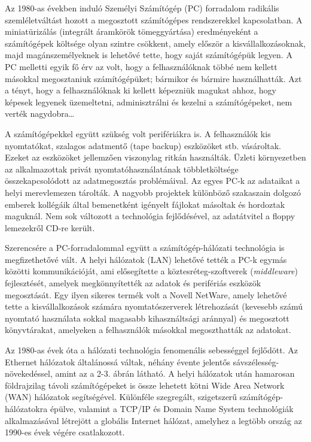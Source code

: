\documentclass[
]{article}
\begin{document}
Az 1980-as években induló Személyi Számítógép (PC) forradalom radikális
szemléletváltást hozott a megosztott számítógépes rendszerekkel
kapcsolatban. A miniatürizálás (integrált áramkörök tömeggyártása)
eredményeként a számítógépek költsége olyan szintre csökkent, amely
először a kisvállalkozásoknak, majd magánszemélyeknek is lehetővé tette,
hogy saját számítógépük legyen. A PC melletti egyik fő érv az volt, hogy
a felhasználóknak többé nem kellett másokkal megosztaniuk
számítógépüket; bármikor és bármire használhatták. Azt a tényt, hogy a
felhasználóknak ki kellett képezniük magukat ahhoz, hogy képesek
legyenek üzemeltetni, adminisztrálni és kezelni a számítógépeket, nem
verték nagydobra\ldots{}

A számítógépekkel együtt szükség volt perifériákra is. A felhasználók
kis nyomtatókat, szalagos adatmentő (tape backup) eszközöket stb.
vásároltak. Ezeket az eszközöket jellemzően viszonylag ritkán
használták. Üzleti környezetben az alkalmazottak privát
nyomtatóhasználatának többletköltsége összekapcsolódott az adatmegosztás
problémáival. Az egyes PC-k az adataikat a helyi merevlemezen tárolták.
A nagyobb projektek különböző szakaszain dolgozó emberek kollégáik által
bemenetként igényelt fájlokat másoltak és hordoztak maguknál. Nem sok
változott a technológia fejlődésével, az adatátvitel a floppy lemezekről
CD-re került.

Szerencsére a PC-forradalommal együtt a számítógép-hálózati technológia
is megfizethetővé vált. A helyi hálózatok (LAN) lehetővé tették a PC-k
egymás közötti kommunikációját, ami elősegítette a
köztesréteg-szoftverek (\emph{middleware}) fejlesztését, amelyek
megkönnyítették az adatok és perifériás eszközök megosztását. Egy ilyen
sikeres termék volt a Novell NetWare, amely lehetővé tette a
kisvállalkozások számára nyomtatószerverek létrehozását (kevesebb számú
nyomtató használata sokkal magasabb kihasználtsági aránnyal) és
megosztott könyvtárakat, amelyeken a felhasználók másokkal megoszthatták
az adatokat.

Az 1980-as évek óta a hálózati technológia fenomenális sebességgel
fejlődött. Az Ethernet hálózatok általánossá váltak, néhány évente
jelentős sávszélesség-növekedéssel, amint az a 2-3. ábrán látható. A
helyi hálózatok után hamarosan földrajzilag távoli számítógépeket is
össze lehetett kötni Wide Area Network (WAN) hálózatok segítségével.
Különféle szegregált, szigetszerű számítógép-hálózatokra épülve,
valamint a TCP/IP és Domain Name System technológiák alkalmazásával
létrejött a globális Internet hálózat, amelyhez a legtöbb ország az
1990-es évek végére csatlakozott.
\end{document}
